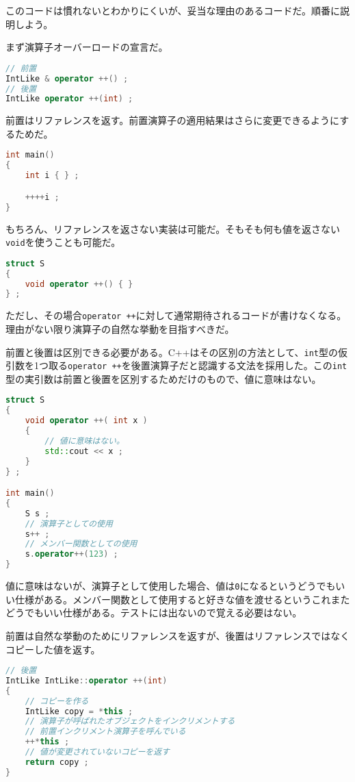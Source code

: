 このコードは慣れないとわかりにくいが、妥当な理由のあるコードだ。順番に説明しよう。

まず演算子オーバーロードの宣言だ。

\begin{lstlisting}[language={C++}]
// 前置
IntLike & operator ++() ;
// 後置
IntLike operator ++(int) ;
\end{lstlisting}

前置はリファレンスを返す。前置演算子の適用結果はさらに変更できるようにするためだ。

\begin{lstlisting}[language={C++}]
int main()
{
    int i { } ;

    ++++i ;
}
\end{lstlisting}

もちろん、リファレンスを返さない実装は可能だ。そもそも何も値を返さない\texttt{void}を使うことも可能だ。

\begin{lstlisting}[language={C++}]
struct S
{
    void operator ++() { }
} ;
\end{lstlisting}

ただし、その場合\texttt{operator ++}に対して通常期待されるコードが書けなくなる。理由がない限り演算子の自然な挙動を目指すべきだ。

前置と後置は区別できる必要がある。C++はその区別の方法として、\texttt{int}型の仮引数を1つ取る\texttt{operator ++}を後置演算子だと認識する文法を採用した。この\texttt{int}型の実引数は前置と後置を区別するためだけのもので、値に意味はない。

\begin{lstlisting}[language={C++}]
struct S
{
    void operator ++( int x )
    {
        // 値に意味はない。
        std::cout << x ;
    }
} ;

int main()
{
    S s ;
    // 演算子としての使用
    s++ ;
    // メンバー関数としての使用
    s.operator++(123) ;
}
\end{lstlisting}

値に意味はないが、演算子として使用した場合、値は\texttt{0}になるというどうでもいい仕様がある。メンバー関数として使用すると好きな値を渡せるというこれまたどうでもいい仕様がある。テストには出ないので覚える必要はない。

前置は自然な挙動のためにリファレンスを返すが、後置はリファレンスではなくコピーした値を返す。

\begin{lstlisting}[language={C++}]
// 後置
IntLike IntLike::operator ++(int)
{
    // コピーを作る
    IntLike copy = *this ;
    // 演算子が呼ばれたオブジェクトをインクリメントする
    // 前置インクリメント演算子を呼んでいる
    ++*this ;
    // 値が変更されていないコピーを返す
    return copy ;
}
\end{lstlisting}

